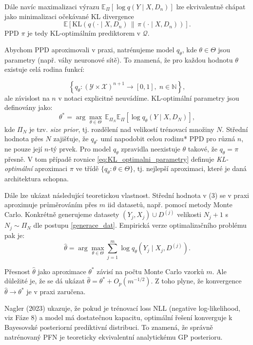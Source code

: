 Dále navíc maximalizaci výrazu $\mathbb{E}_\Pi[\log q(Y \mid X, D_n)]$ lze ekvivalentně chápat jako minimalizaci očekávané KL divergence
$$\mathbb{E}\!\left[\mathrm{KL}\!\left(q(\cdot \mid X, D_n) \,\Big\|\, \pi(\cdot \mid X, D_n)\right)\right].$$
PPD $\pi$ je tedy KL-optimálním prediktorem v $\mathcal{Q}$.

Abychom PPD aproximovali v praxi, natrénujeme model $q_\theta$, kde $\theta \in \Theta$ jsou parametry (např. váhy neuronové sítě). 
To znamená, že pro každou hodnotu $\theta$ existuje celá rodina funkcí:

$$\left\{q_{\theta} : (\mathcal{Y} \times \mathcal{X})^{n+1} \to [0,1],\; n \in \mathbb{N}\right\},$$
ale závislost na $n$ v notaci explicitně neuvádíme. 
KL-optimální parametry jsou definovány jako:
\begin{equation}
    \theta^* = \arg\max_{\theta \in \Theta} \, \mathbb{E}_{\Pi_N} \mathbb{E}_\Pi[\log q_\theta(Y \mid X, D_N)],
\label{eq:KL_optimalni_parametry}
\end{equation}
kde $\Pi_N$ je tzv. \textit{size prior}, tj. rozdělení nad velikostí trénovací množiny $N$. 
Střední hodnota přes $N$ zajišťuje, že $q_{\theta^*}$ umí napodobit celou rodinu* PPD pro různá $n$, ne pouze její $n$-tý prvek.
Pro model $q_\theta$ zpravidla neexistuje $\theta$ takové, že $q_\theta = \pi$ přesně. 
V tom případě rovnice \ref{eq:KL_optimalni_parametry} definuje \textit{KL-optimální} aproximaci $\pi$ ve třídě $\{q_\theta : \theta \in \Theta\}$, tj. nejlepší aproximaci, které je daná architektura schopna.

Dále lze ukázat následující teoretickou vlastnost.
Střední hodnota v (3) se v praxi aproximuje průměrováním přes $m$ iid datasetů, např. pomocí metody Monte Carlo.
Konkrétně generujeme datasety $(Y_j, X_j) \cup D^{(j)}$ velikosti $N_j + 1$ s $N_j \sim \Pi_N$ dle postupu \ref{generace_dat}. 
Empirická verze optimalizačního problému pak je:
\begin{equation}
    \hat{\theta} = \arg\max_{\theta \in \Theta} \sum_{j=1}^{m} \log q_\theta(Y_j \mid X_j, D^{(j)}). 
\label{optimalni_theta_empiricky}
\end{equation}

Přesnost $\hat{\theta}$ jako aproximace $\theta^*$ závisí na počtu Monte Carlo vzorků $m$.
Ale důležité je, že se dá ukázat $\hat{\theta} = \theta^* + O_p(m^{-1/2})$.
Z toho plyne, že konvergence $\hat{\theta} \to \theta^*$ je v praxi zaručena.

Nagler (2023) ukazuje, že pokud je trénovací loss NLL (negative log-likelihood, viz Fáze 8) a model má dostatečnou kapacitu, optimální řešení konverguje k Bayesovské posteriorní prediktivní distribuci. To znamená, že správně natrénovaný PFN je teoreticky ekvivalentní analytickému GP posterioru.


